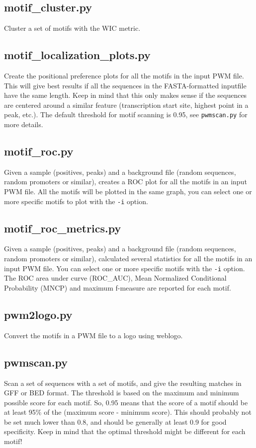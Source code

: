 \documentclass[11pt]{article}
\begin{document}
\subsection*{motif\_cluster.py}
Cluster a set of motifs with the WIC metric.

\subsection*{motif\_localization\_plots.py}
Create the positional preference plots for all the motifs in the input PWM file. This will give best results if all the sequences in the FASTA-formatted inputfile have the same length. Keep in mind that this only makes sense if the sequences are centered around a similar feature (transcription start site, highest point in a peak, etc.). The default threshold for motif scanning is 0.95, see \texttt{pwmscan.py} for more details.

\subsection*{motif\_roc.py}
Given a sample (positives, peaks) and a background file (random sequences, random promoters or similar),  creates a ROC plot for all the motifs in an input PWM file. All the motifs will be plotted in the same graph, you can select one or more specific motifs to plot with the \texttt{-i} option.

\subsection*{motif\_roc\_metrics.py}
Given a sample (positives, peaks) and a background file (random sequences, random promoters or similar),  calculated several statistics for all the motifs in an input PWM file. You can select one or more specific motifs with the \texttt{-i} option. The ROC area under curve (ROC\_AUC), Mean Normalized Conditional Probability (MNCP) and maximum f-measure are reported for each motif.

\subsection*{pwm2logo.py}
Convert the motifs in a PWM file to a logo using weblogo.

\subsection*{pwmscan.py}
Scan a set of sequences with a set of motifs, and give the resulting matches in GFF or BED format. The threshold is based on the maximum and minimum possible score for each motif. So, 0.95 means that the score of a motif should be at least 95\% of the (maximum score - minimum score). This should probably not be set much lower than 0.8, and should be generally at least 0.9 for good specificity. Keep in mind that the optimal threshold might be different for each motif!
\end{document}
